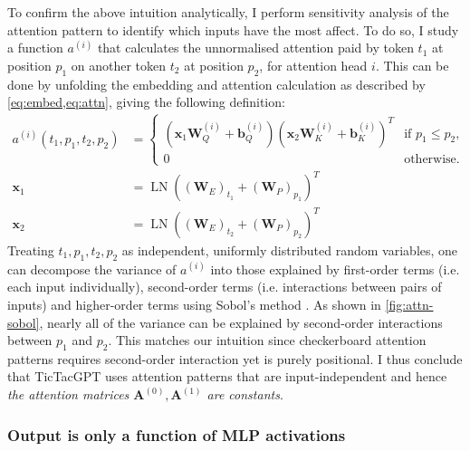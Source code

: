 \documentclass{article}
\newcommand{\ttgpt}{TicTacGPT\xspace}
\renewcommand{\v}[1]{\mathbf{\bm{#1}}}
\newcommand{\m}[1]{\mathbf{\bm{#1}}}
\DeclareMathOperator{\layernorm}{LN}
\begin{document}
To confirm the above intuition analytically, I perform sensitivity analysis of the attention pattern to identify which inputs have the most affect. To do so, I study a function $a^{(i)}$ that calculates the unnormalised attention paid by token $t_1$ at position $p_1$ on another token $t_2$ at position $p_2$, for attention head $i$. This can be done by unfolding the embedding and attention calculation as described by \cref{eq:embed,eq:attn}, giving the following definition:
\begin{equation*}
    \begin{aligned}
        a^{(i)}(t_1, p_1, t_2, p_2)
         & =\begin{cases}
                \left(\v{x}_1 \m{W}_Q^{(i)} + \v{b}_Q^{(i)}\right)
                \left(\v{x}_2 \m{W}_K^{(i)} + \v{b}_K^{(i)}\right)^T
                  & \text{if }p_1 \leq p_2, \\
                0 & \text{otherwise.}
            \end{cases} \\
        \v{x}_1
         & = \layernorm((\m{W}_E)_{t_1} + (\m{W}_P)_{p_1})^T    \\
        \v{x}_2
         & = \layernorm((\m{W}_E)_{t_2} + (\m{W}_P)_{p_2})^T
    \end{aligned}
\end{equation*}
Treating $t_1, p_1, t_2, p_2$ as independent, uniformly distributed random variables, one can decompose the variance of $a^{(i)}$ into those explained by first-order terms (i.e. each input individually), second-order terms (i.e. interactions between pairs of inputs) and higher-order terms using Sobol's method \citep{sobol1993sensitivity,sobol2001global}. As shown in \cref{fig:attn-sobol}, nearly all of the variance can be explained by second-order interactions between $p_1$ and $p_2$. This matches our intuition since checkerboard attention patterns requires second-order interaction yet is purely positional. I thus conclude that \ttgpt uses attention patterns that are input-independent and hence \emph{the attention matrices $\m{A}^{(0)}, \m{A}^{(1)}$ are constants}.

\subsubsection{Output is only a function of MLP activations}


\end{document}
